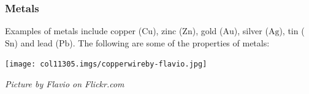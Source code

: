             \subsubsection{ Metals}
            \nopagebreak
\begin{minipage}{.5\textwidth}
        \label{m38708*id65726}Examples of metals include copper ($\mathrm{Cu}$), zinc ($\mathrm{Zn}$), gold ($\mathrm{Au}$), silver ($\mathrm{Ag}$), tin ($\mathrm{Sn}$) and lead ($\mathrm{Pb}$). The following are some of the properties of metals:\par 
\end{minipage}
\begin{minipage}{.5\textwidth}
\begin{center}
 \texttt{[image: col11305.imgs/copperwireby-flavio.jpg]}\par
\textit{Picture by Flavio on Flickr.com}
\end{center}
\end{minipage}
